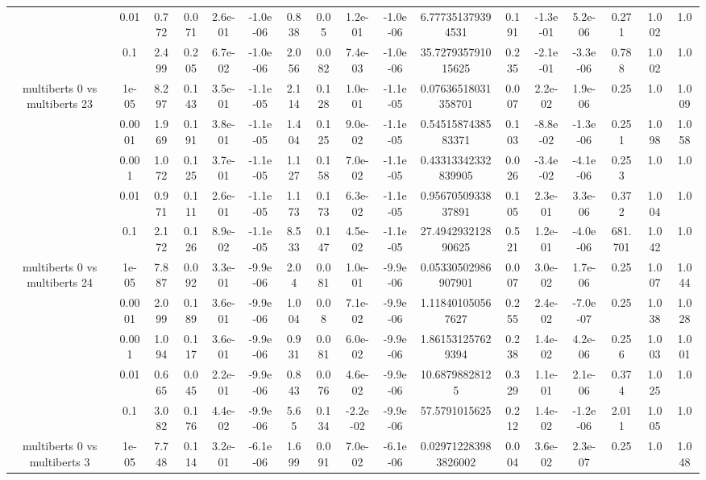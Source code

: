 \begin{tabular}{|c|c|c|c|c|c|c|c|c|c|c|c|c|c|c|c|c|}
 & 0.01 & 0.772 & 0.071 & 2.6e-01 & -1.0e-06 & 0.838 & 0.05 & 1.2e-01 & -1.0e-06 & 6.777351379394531 & 0.191 & -1.3e-01 & 5.2e-06 & 0.271 & 1.002 & 1.0 \\
 & 0.1 & 2.499 & 0.205 & 6.7e-02 & -1.0e-06 & 2.056 & 0.082 & 7.4e-03 & -1.0e-06 & 35.727935791015625 & 0.235 & -2.1e-01 & -3.3e-06 & 0.788 & 1.002 & 1.0 \\
\hline
\multirow{5}{*}{multiberts 0 vs multiberts 23} & 1e-05 & 8.297 & 0.143 & 3.5e-01 & -1.1e-05 & 2.114 & 0.128 & 1.0e-01 & -1.1e-05 & 0.07636518031358701 & 0.007 & 2.2e-02 & 1.9e-06 & 0.25 & 1.0 & 1.009 \\
 & 0.0001 & 1.969 & 0.191 & 3.8e-01 & -1.1e-05 & 1.404 & 0.125 & 9.0e-02 & -1.1e-05 & 0.5451587438583371 & 0.103 & -8.8e-02 & -1.3e-06 & 0.251 & 1.098 & 1.058 \\
 & 0.001 & 1.072 & 0.125 & 3.7e-01 & -1.1e-05 & 1.127 & 0.158 & 7.0e-02 & -1.1e-05 & 0.43313342332839905 & 0.026 & -3.4e-02 & -4.1e-06 & 0.253 & 1.0 & 1.0 \\
 & 0.01 & 0.971 & 0.111 & 2.6e-01 & -1.1e-05 & 1.173 & 0.173 & 6.3e-02 & -1.1e-05 & 0.9567050933837891 & 0.105 & 2.3e-01 & 3.3e-06 & 0.372 & 1.004 & 1.0 \\
 & 0.1 & 2.172 & 0.126 & 8.9e-02 & -1.1e-05 & 8.533 & 0.147 & 4.5e-02 & -1.1e-05 & 27.494293212890625 & 0.521 & 1.2e-01 & -4.0e-06 & 681.701 & 1.042 & 1.0 \\
\hline
\multirow{5}{*}{multiberts 0 vs multiberts 24} & 1e-05 & 7.887 & 0.092 & 3.3e-01 & -9.9e-06 & 2.04 & 0.081 & 1.0e-01 & -9.9e-06 & 0.05330502986907901 & 0.007 & 3.0e-02 & 1.7e-06 & 0.25 & 1.007 & 1.044 \\
 & 0.0001 & 2.099 & 0.189 & 3.6e-01 & -9.9e-06 & 1.004 & 0.08 & 7.1e-02 & -9.9e-06 & 1.118401050567627 & 0.255 & 2.4e-02 & -7.0e-07 & 0.25 & 1.038 & 1.028 \\
 & 0.001 & 1.094 & 0.117 & 3.6e-01 & -9.9e-06 & 0.931 & 0.081 & 6.0e-02 & -9.9e-06 & 1.861531257629394 & 0.238 & 1.4e-02 & 4.2e-06 & 0.256 & 1.003 & 1.001 \\
 & 0.01 & 0.665 & 0.045 & 2.2e-01 & -9.9e-06 & 0.843 & 0.076 & 4.6e-02 & -9.9e-06 & 10.68798828125 & 0.329 & 1.1e-01 & 2.1e-06 & 0.374 & 1.025 & 1.0 \\
 & 0.1 & 3.082 & 0.176 & 4.4e-02 & -9.9e-06 & 5.65 & 0.134 & -2.2e-02 & -9.9e-06 & 57.5791015625 & 0.212 & 1.4e-02 & -1.2e-06 & 2.011 & 1.005 & 1.0 \\
\hline
\multirow{5}{*}{multiberts 0 vs multiberts 3} & 1e-05 & 7.748 & 0.114 & 3.2e-01 & -6.1e-06 & 1.699 & 0.091 & 7.0e-02 & -6.1e-06 & 0.029712283983826002 & 0.004 & 3.6e-02 & 2.3e-07 & 0.25 & 1.0 & 1.048 \\

\end{tabular}
